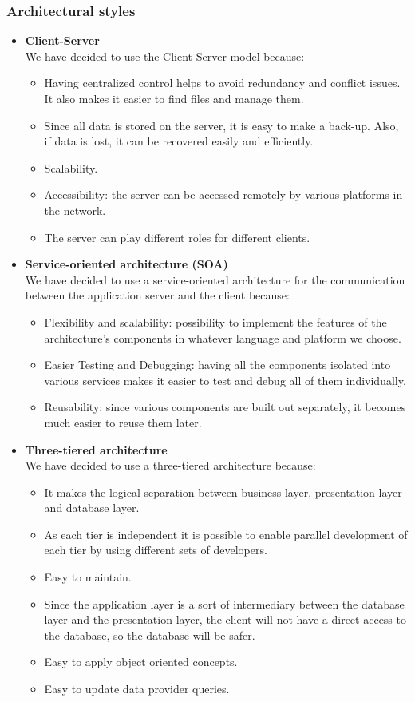 \subsubsection{Architectural styles}
\begin{itemize}
	\item \textbf{Client-Server}\\
	We have decided to use the Client-Server model because:
	\begin{itemize}
		\item Having centralized control helps to avoid redundancy and conflict issues. It also makes it easier to find files and manage them.
		\item Since all data is stored on the server, it is easy to make a back-up. Also, if data is lost, it can be recovered easily and efficiently.
		\item Scalability.
		\item Accessibility: the server can be accessed remotely by various platforms in the network.
		\item The server can play different roles for different clients.
	\end{itemize}
	\item \textbf{Service-oriented architecture (SOA)}\\
	We have decided to use a service-oriented architecture for the communication between the application server and the client because:
	\begin{itemize}
		\item Flexibility and scalability: possibility to implement the features of the architecture's components in whatever language and platform we choose.
		\item Easier Testing and Debugging: having all the components isolated into various services makes it easier to test and debug all of them individually.
		\item Reusability: since various components are built out separately, it becomes much easier to reuse them later.
	\end{itemize}
	\item \textbf{Three-tiered architecture}\\
	We have decided to use a three-tiered architecture because: 
	\begin{itemize}
		\item It makes the logical separation between business layer, presentation layer and database layer.
		\item As each tier is independent it is possible to enable parallel development of each tier by using different sets of developers.
		\item Easy to maintain.
		\item Since the application layer is a sort of intermediary between the database layer and the presentation layer, the client will not have a direct access to the database, so the database will be safer.
		\item Easy to apply object oriented concepts.
		\item Easy to update data provider queries.
	\end{itemize}
\end{itemize}
